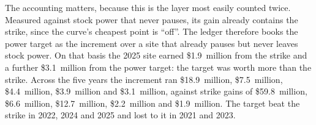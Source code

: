 The accounting matters, because this is the layer most easily counted twice. Measured against stock power that never pauses, its gain already contains the strike, since the curve's cheapest point is ``off''. The ledger therefore books the power target as the increment over a site that already pauses but never leaves stock power. On that basis the 2025 site earned \$1.9~million from the strike and a further \$3.1~million from the power target: the target was worth more than the strike. Across the five years the increment ran \$18.9~million, \$7.5~million, \$4.4~million, \$3.9~million and \$3.1~million, against strike gains of \$59.8~million, \$6.6~million, \$12.7~million, \$2.2~million and \$1.9~million. %
The target beat the strike in 2022, 2024 and 2025 and lost to it in 2021 and 2023. %


